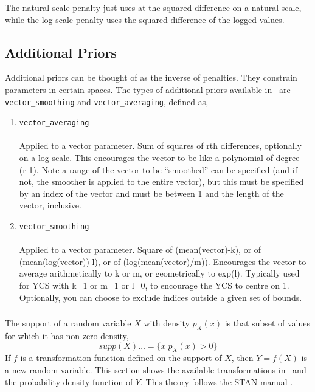 The natural scale penalty just uses at the squared difference on a natural scale, while the log scale penalty uses the squared difference of the logged values. 

\subsection{Additional Priors\label{sec:additional_priors}}
Additional priors can be thought of as the inverse of penalties. They constrain parameters in certain spaces. The types of additional priors available in \CNAME\ are \texttt{vector\_smoothing} and \texttt{vector\_averaging}, defined as,

\begin{enumerate}
	\item \texttt{vector\_averaging}
	\\\\	
	Applied to a vector parameter. Sum of squares of rth differences, optionally on a log scale. This encourages the vector to be like a polynomial of degree (r-1). Note a range of the vector to be “smoothed” can be specified (and if not, the smoother is applied to the entire vector), but this must be specified by an index of the vector and must be between 1 and the length of the vector, inclusive.
	\item \texttt{vector\_smoothing}
	\\\\
	Applied to a vector parameter. Square of (mean(vector)-k), or of (mean(log(vector))-l), or of (log(mean(vector)/m)). Encourages the vector to average arithmetically to k or m, or geometrically to exp(l). Typically used for YCS with k=1 or m=1 or l=0, to encourage the YCS to centre on 1. Optionally, you can choose to exclude indices outside a given set of bounds.
\end{enumerate}

\subsubsection{\label{sec:transformations}}

The support of a random variable $X$ with density $p_X(x)$ is that subset of values for which it has non-zero density, 
$$ supp(X) = \{x|p_X(x) > 0\}$$ 
If $f$ is a transformation function defined on the support of $X$, then $Y = f(X)$ is a new random variable. This section shows the available transformations in \CNAME\ and the probability density function of $Y$. This theory follows the STAN manual \cite{STAN}.

